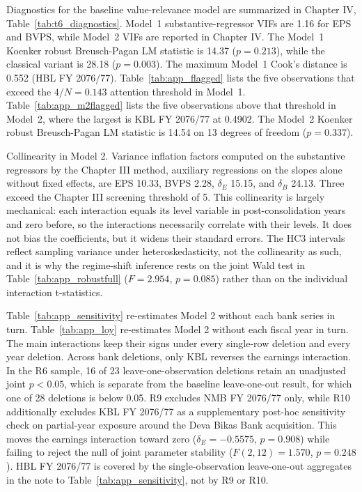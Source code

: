 Diagnostics for the baseline value-relevance model are summarized in Chapter IV, Table~\ref{tab:t6_diagnostics}. Model~1 substantive-regressor VIFs are 1.16 for EPS and BVPS, while Model~2 VIFs are reported in Chapter IV. The Model~1 Koenker robust Breusch-Pagan LM statistic is 14.37 ($p=0.213$), while the classical variant is 28.18 ($p=0.003$). The maximum Model~1 Cook's distance is 0.552 (HBL FY 2076/77). Table~\ref{tab:app_flagged} lists the five observations that exceed the $4/N=0.143$ attention threshold in Model~1. Table~\ref{tab:app_m2flagged} lists the five observations above that threshold in Model~2, where the largest is KBL FY 2076/77 at 0.4902. The Model~2 Koenker robust Breusch-Pagan LM statistic is 14.54 on 13 degrees of freedom ($p=0.337$).

Collinearity in Model 2. Variance inflation factors computed on the substantive regressors by the Chapter III method, auxiliary regressions on the slopes alone without fixed effects, are EPS 10.33, BVPS 2.28, $\delta_E$ 15.15, and $\delta_B$ 24.13. Three exceed the Chapter III screening threshold of 5. This collinearity is largely mechanical: each interaction equals its level variable in post-consolidation years and zero before, so the interactions necessarily correlate with their levels. It does not bias the coefficients, but it widens their standard errors. The HC3 intervals reflect sampling variance under heteroskedasticity, not the collinearity as such, and it is why the regime-shift inference rests on the joint Wald test in Table~\ref{tab:app_robustfull} ($F = 2.954$, $p = 0.085$) rather than on the individual interaction t-statistics.

Table~\ref{tab:app_sensitivity} re-estimates Model 2 without each bank series in turn. Table~\ref{tab:app_loy} re-estimates Model 2 without each fiscal year in turn. The main interactions keep their signs under every single-row deletion and every year deletion. Across bank deletions, only KBL reverses the earnings interaction. In the R6 sample, 16 of 23 leave-one-observation deletions retain an unadjusted joint $p<0.05$, which is separate from the baseline leave-one-out result, for which one of 28 deletions is below 0.05. R9 excludes NMB FY 2076/77 only, while R10 additionally excludes KBL FY 2076/77 as a supplementary post-hoc sensitivity check on partial-year exposure around the Deva Bikas Bank acquisition. This moves the earnings interaction toward zero ($\delta_E = -0.5575$, $p = 0.908$) while failing to reject the null of joint parameter stability ($F(2,12) = 1.570$, $p = 0.248$). HBL FY 2076/77 is covered by the single-observation leave-one-out aggregates in the note to Table~\ref{tab:app_sensitivity}, not by R9 or R10.

